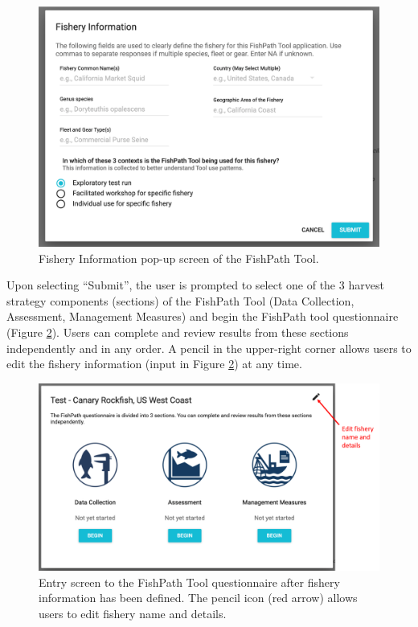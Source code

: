 \documentclass[
  11pt,
]{book}
\begin{document}
\begin{figure}

{\centering \includegraphics[width=0.95\linewidth]{images/fishery-info-screen} 

}

\caption{Fishery Information pop-up screen of the FishPath Tool.}\label{fig:fishery-info}
\end{figure}

Upon selecting ``Submit'', the user is prompted to select one of the 3 harvest strategy components (sections) of the FishPath Tool (Data Collection, Assessment, Management Measures) and begin the FishPath tool questionnaire (Figure \ref{fig:fishery-entry}). Users can complete and review results from these sections independently and in any order. A pencil in the upper-right corner allows users to edit the fishery information (input in Figure \ref{fig:fishery-entry}) at any time.

\begin{figure}

{\centering \includegraphics[width=0.95\linewidth]{images/fishery-entry-screen} 

}

\caption{Entry screen to the FishPath Tool questionnaire after fishery information has been defined. The pencil icon (red arrow) allows users to edit fishery name and details.}\label{fig:fishery-entry}
\end{figure}
\end{document}
